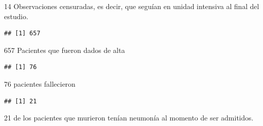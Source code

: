 \documentclass[
]{article}
\newenvironment{Shaded}{\begin{snugshade}}{\end{snugshade}}
\newcommand{\DecValTok}[1]{\textcolor[rgb]{0.00,0.00,0.81}{#1}}
\newcommand{\FunctionTok}[1]{\textcolor[rgb]{0.00,0.00,0.00}{#1}}
\newcommand{\NormalTok}[1]{#1}
\newcommand{\SpecialCharTok}[1]{\textcolor[rgb]{0.00,0.00,0.00}{#1}}
\begin{document}
14 Observaciones censuradas, es decir, que seguían en unidad intensiva
al final del estudio.

\begin{Shaded}
\end{Shaded}

\begin{verbatim}
## [1] 657
\end{verbatim}

657 Pacientes que fueron dados de alta

\begin{Shaded}
\end{Shaded}

\begin{verbatim}
## [1] 76
\end{verbatim}

76 pacientes fallecieron

\begin{Shaded}
\end{Shaded}

\begin{verbatim}
## [1] 21
\end{verbatim}

21 de los pacientes que murieron tenían neumonía al momento de ser
admitidos.

\begin{Shaded}
\end{Shaded}
\end{document}
